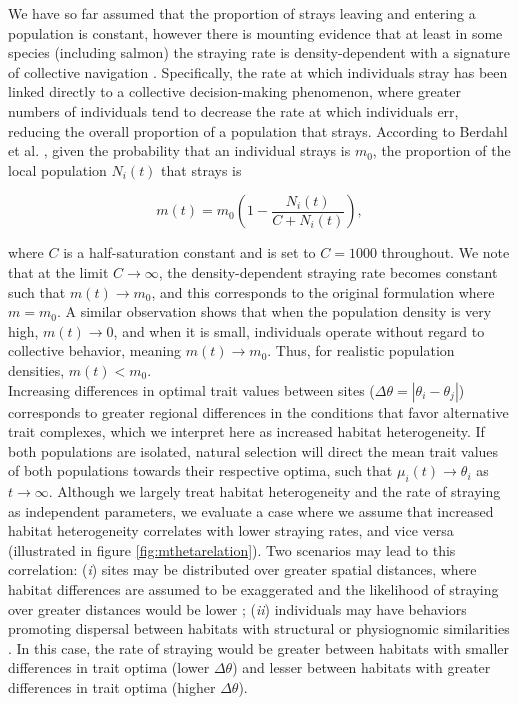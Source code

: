 \documentclass{revtex4}
\begin{document}
\noindent We have so far assumed that the proportion of strays leaving and entering a population is constant, however there is mounting evidence that at least in some species (including salmon) the straying rate is density-dependent with a signature of collective navigation \citep{Berdahl:2016dx,Bett:2017ha}.
Specifically, the rate at which individuals stray has been linked directly to a collective decision-making phenomenon, where greater numbers of individuals tend to decrease the rate at which individuals err, reducing the overall proportion of a population that strays.
According to Berdahl et al. \citep{Berdahl:2014bl,Berdahl:2016dx}, given the probability that an individual strays is $m_0$, the proportion of the local population $N_i(t)$ that strays is

\begin{equation}
  m(t) = m_0\left(1- \frac{N_i(t)}{C+N_i(t)}\right),
  \label{eq:ddm}
\end{equation}

\noindent where $C$ is a half-saturation constant and is set to $C=1000$ throughout.
We note that at the limit $C\rightarrow \infty$, the density-dependent straying rate becomes constant such that $m(t) \rightarrow m_0$, and this corresponds to the original formulation where $m=m_0$.
A similar observation shows that when the population density is very high, $m(t) \rightarrow 0$, and when it is small, individuals operate without regard to collective behavior, meaning $m(t) \rightarrow m_0$.
Thus, for realistic population densities, $m(t) < m_0$.\\


\noindent Increasing differences in optimal trait values between sites ($\Delta\theta = \left|\theta_i - \theta_j\right|$) corresponds to greater regional differences in the conditions that favor alternative trait complexes, which we interpret here as increased habitat heterogeneity.
If both populations are isolated, natural selection will direct the mean trait values of both populations towards their respective optima, such that $\mu_i(t) \rightarrow \theta_i$ as $t\rightarrow\infty$.
Although we largely treat habitat heterogeneity and the rate of straying as independent parameters, we evaluate a case where we assume that increased habitat heterogeneity correlates with lower straying rates, and vice versa (illustrated in figure \ref{fig:mthetarelation}).
Two scenarios may lead to this correlation: 
(\emph{i}) sites may be distributed over greater spatial distances, where habitat differences are assumed to be exaggerated and the likelihood of straying over greater distances would be lower \citep{Candy:2000hu,JPE:JPE1383};
(\emph{ii}) individuals may have behaviors promoting dispersal between habitats with structural or physiognomic similarities \citep{Peterson:2014gy}.
In this case, the rate of straying would be greater between habitats with smaller differences in trait optima (lower $\Delta\theta$) and lesser between habitats with greater differences in trait optima (higher $\Delta\theta$).
\end{document}
